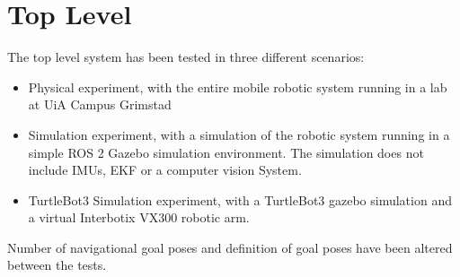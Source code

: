 

\FloatBarrier
\section{Top Level} \label{sec:R:TopLevel}
The top level system has been tested in three different scenarios:
\begin{itemize}
    \item Physical experiment, with the entire mobile robotic system running in a lab at UiA Campus Grimstad
    \item Simulation experiment, with a simulation of the robotic system running in a simple ROS 2 Gazebo simulation environment. The simulation does not include IMUs, EKF or a computer vision System.
    \item TurtleBot3 Simulation experiment, with a TurtleBot3 gazebo simulation and a virtual Interbotix VX300 robotic arm.
\end{itemize}

Number of navigational goal poses and definition of goal poses have been altered between the tests.

\FloatBarrier
